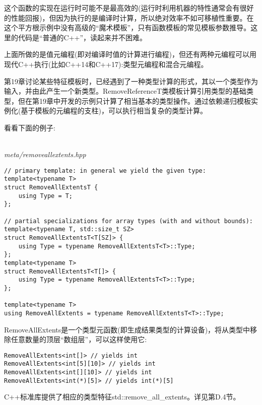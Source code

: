 这个函数的实现在运行时可能不是最高效的(运行时利用机器的特性通常会有很好的性能回报)，但因为执行的是编译时计算，所以绝对效率不如可移植性重要。在这个平方根示例中没有高级的“魔术模板”，只有函数模板的常见模板参数推导。这里的代码是“普通的C++”，读起来并不困难。

上面所做的是值元编程(即对编译时值的计算进行编程)，但还有两种元编程可以用现代C++执行(比如C++14和C++17):类型元编程和混合元编程。


第19章讨论某些特征模板时，已经遇到了一种类型计算的形式，其以一个类型作为输入，并由此产生一个新类型。RemoveReferenceT类模板计算引用类型的基础类型，但在第19章中开发的示例只计算了相当基本的类型操作。通过依赖递归模板实例化(基于模板的元编程的支柱)，可以执行相当复杂的类型计算。

看看下面的例子:

\hspace*{\fill} \\ %
\noindent
\textit{meta/removeallextents.hpp}
\begin{lstlisting}[style=styleCXX]
// primary template: in general we yield the given type:
template<typename T>
struct RemoveAllExtentsT {
	using Type = T;
};

// partial specializations for array types (with and without bounds):
template<typename T, std::size_t SZ>
struct RemoveAllExtentsT<T[SZ]> {
	using Type = typename RemoveAllExtentsT<T>::Type;
};
template<typename T>
struct RemoveAllExtentsT<T[]> {
	using Type = typename RemoveAllExtentsT<T>::Type;
};

template<typename T>
using RemoveAllExtents = typename RemoveAllExtentsT<T>::Type;
\end{lstlisting}

RemoveAllExtents是一个类型元函数(即生成结果类型的计算设备)，将从类型中移除任意数量的顶层“数组层”，可以这样使用它:

\begin{lstlisting}[style=styleCXX]
RemoveAllExtents<int[]> // yields int
RemoveAllExtents<int[5][10]> // yields int
RemoveAllExtents<int[][10]> // yields int
RemoveAllExtents<int(*)[5]> // yields int(*)[5]
\end{lstlisting}

\begin{tcolorbox}[colback=webgreen!5!white,colframe=webgreen!75!black]
\hspace*{0.75cm}C++标准库提供了相应的类型特征std::remove\_all\_extents。详见第D.4节。
\end{tcolorbox}

